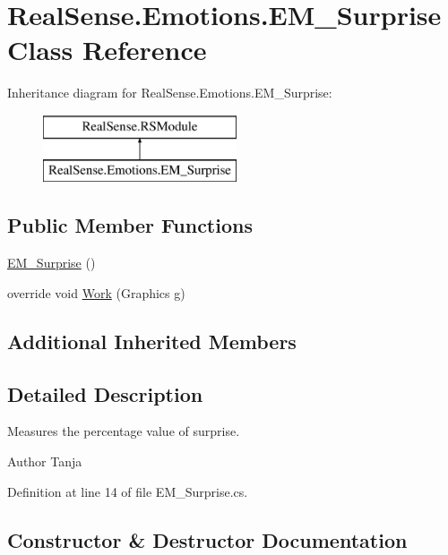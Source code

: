 \hypertarget{class_real_sense_1_1_emotions_1_1_e_m___surprise}{}\section{Real\+Sense.\+Emotions.\+E\+M\+\_\+\+Surprise Class Reference}
\label{class_real_sense_1_1_emotions_1_1_e_m___surprise}
Inheritance diagram for Real\+Sense.\+Emotions.\+E\+M\+\_\+\+Surprise\+:\begin{figure}[H]
\begin{center}
\leavevmode
\includegraphics[height=2.000000cm]{class_real_sense_1_1_emotions_1_1_e_m___surprise}
\end{center}
\end{figure}
\subsection*{Public Member Functions}
\begin{DoxyCompactItemize}
\item 
\hyperlink{class_real_sense_1_1_emotions_1_1_e_m___surprise_a95c89a129f31134f35b0d34a212e7d29}{E\+M\+\_\+\+Surprise} ()
\item 
override void \hyperlink{class_real_sense_1_1_emotions_1_1_e_m___surprise_a08040934bb081596a4b02b483dc3a662}{Work} (Graphics g)
\end{DoxyCompactItemize}
\subsection*{Additional Inherited Members}


\subsection{Detailed Description}
Measures the percentage value of surprise. \begin{DoxyAuthor}{Author}
Tanja 
\end{DoxyAuthor}


Definition at line 14 of file E\+M\+\_\+\+Surprise.\+cs.



\subsection{Constructor \& Destructor Documentation}
\mbox{\label{class_real_sense_1_1_emotions_1_1_e_m___surprise_a95c89a129f31134f35b0d34a212e7d29}} 
